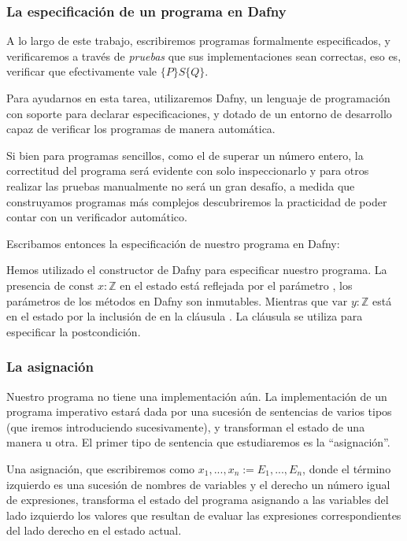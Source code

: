 \documentclass[12pt, a4paper, openany, fleqn]{book}
\newcommand{\declConst}[2]{\text{const } #1 : #2}
\newcommand{\declVar}[2]{\text{var } #1 : #2}
\begin{document}
    \subsubsection*{La especificación de un programa en Dafny}

    A lo largo de este trabajo, escribiremos programas formalmente especificados, y verificaremos a través de \textit{pruebas} que sus implementaciones sean correctas, eso es, verificar que efectivamente vale $\{P\}S\{Q\}$.

    Para ayudarnos en esta tarea, utilizaremos Dafny, un lenguaje de programación con soporte para declarar especificaciones, y dotado de un entorno de desarrollo capaz de verificar los programas de manera automática.

    Si bien para programas sencillos, como el de superar un número entero, la correctitud del programa será evidente con solo inspeccionarlo y para otros realizar las pruebas manualmente no será un gran desafío, a medida que construyamos programas más complejos descubriremos la practicidad de poder contar con un verificador automático.

    Escribamos entonces la especificación de nuestro programa en Dafny:


    Hemos utilizado el constructor  de Dafny para especificar nuestro programa. La presencia de $\declConst{x}{\mathbb{Z}}$ en el estado está reflejada por el parámetro , los parámetros de los métodos en Dafny son inmutables. Mientras que $\declVar{y}{\mathbb{Z}}$ está en el estado por la inclusión de  en la cláusula .
    La cláusula  se utiliza para especificar la postcondición.

    \subsubsection*{La asignación}
    Nuestro programa no tiene una implementación aún. La implementación de un programa imperativo estará dada por una sucesión de sentencias de varios tipos (que iremos introduciendo sucesivamente), y transforman el estado de una manera u otra. El primer tipo de sentencia que estudiaremos es la ``asignación''.

    Una asignación, que escribiremos como $x_1,...,x_n := E_1,...,E_n$, donde el término izquierdo es una sucesión de nombres de variables y el derecho un número igual de expresiones, transforma el estado del programa asignando a las variables del lado izquierdo los valores que resultan de evaluar las expresiones correspondientes del lado derecho en el estado actual.
\end{document}
